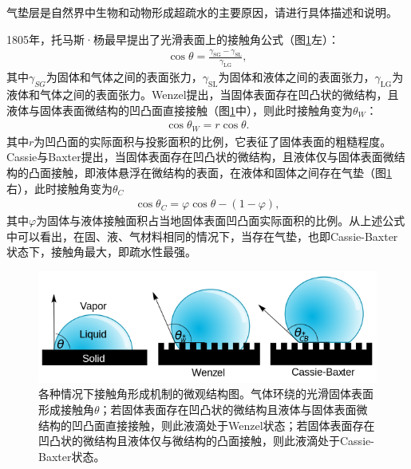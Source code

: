 \documentclass{assignment}
\begin{document}
\begin{ti}
    气垫层是自然界中生物和动物形成超疏水的主要原因，请进行具体描述和说明。
\end{ti}
\begin{da}
    1805年，托马斯·杨最早提出了光滑表面上的接触角公式（图\ref{Contact-angle-microstates}左）：
    \begin{align}
        \cos\theta=\frac{\gamma_{\text{SG}}-\gamma_{\text{SL}}}{\gamma_{\text{LG}}},
    \end{align}
    其中$\gamma_{SG}$为固体和气体之间的表面张力，$\gamma_{\text{SL}}$为固体和液体之间的表面张力，$\gamma_{\text{LG}}$为液体和气体之间的表面张力。Wenzel提出，当固体表面存在凹凸状的微结构，且液体与固体表面微结构的凹凸面直接接触（图\ref{Contact-angle-microstates}中），则此时接触角变为$\theta_W$：
    \begin{align}
        \cos\theta_W=r\cos\theta.
    \end{align}
    其中$r$为凹凸面的实际面积与投影面积的比例，它表征了固体表面的粗糙程度。Cassie与Baxter提出，当固体表面存在凹凸状的微结构，且液体仅与固体表面微结构的凸面接触，即液体悬浮在微结构的表面，在液体和固体之间存在气垫（图\ref{Contact-angle-microstates}右），此时接触角变为$\theta_C$
    \begin{align}
        \cos\theta_C=\varphi\cos\theta-(1-\varphi),
    \end{align}
    其中$\varphi$为固体与液体接触面积占当地固体表面凹凸面实际面积的比例。从上述公式中可以看出，在固、液、气材料相同的情况下，当存在气垫，也即Cassie-Baxter状态下，接触角最大，即疏水性最强。
    \begin{figure}[H]
        \centering
        \includegraphics[width=.5\columnwidth]{Contact-angle-microstates.png}
        \caption{各种情况下接触角形成机制的微观结构图。气体环绕的光滑固体表面形成接触角$\theta$；若固体表面存在凹凸状的微结构且液体与固体表面微结构的凹凸面直接接触，则此液滴处于Wenzel状态；若固体表面存在凹凸状的微结构且液体仅与微结构的凸面接触，则此液滴处于Cassie-Baxter状态。}
        \label{Contact-angle-microstates}
    \end{figure}


\end{da}
\end{document}
